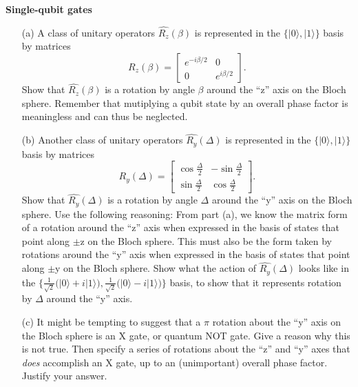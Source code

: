 \documentclass[12pt,letterpaper,boxed,cm]{hmcpset}
\newcommand{\ket}[1]{\big\lvert #1\big\rangle}
\begin{document}
\begin{problem}[2] 
    \textbf{Single-qubit gates} 
    \begin{enumerate}
        \item [(a)] A class of unitary operators $\hat{R_z}(\beta)$ is represented in the $\{\ket{0},\ket{1}\}$ basis by matrices 
        \[
            R_z(\beta) = \begin{bmatrix} e^{-i\beta/2} &  0 \\ 0 & e^{i\beta/2} \end{bmatrix}.
        \]
        Show that $\hat{R_z}(\beta)$ is a rotation by angle $\beta$ around the ``z'' axis on the Bloch sphere.  Remember that mutiplying a qubit state by an overall phase factor is meaningless and can thus be neglected.
        \item [(b)] Another class of unitary operators $\hat{R_y}(\Delta)$ is represented in the $\{\ket{0},\ket{1}\}$ basis by matrices 
        \[
            R_y(\Delta)=\begin{bmatrix} \cos \frac{\Delta}{2} & -\sin \frac{\Delta}{2} \\ \sin \frac{\Delta}{2} & \cos \frac{\Delta}{2} \end{bmatrix}.
        \]
        Show that $\hat{R_y}(\Delta)$ is a rotation by angle $\Delta$ around the ``y'' axis on the Bloch sphere.  Use the following reasoning:  From part (a), we know the matrix form of a rotation around the ``z'' axis when expressed in the basis of states that point along $\pm$z on the Bloch sphere.  This must also be the form taken by rotations around the ``y'' axis when expressed in the basis of states that point along $\pm$y on the Bloch sphere.  Show what the action of $\hat{R_y}(\Delta)$ looks like in the $\{\frac{1}{\sqrt{2}}\bigl(\ket{0}+i\ket{1}\bigr), \frac{1}{\sqrt{2}}\bigl(\ket{0}-i\ket{1}\bigr)\}$ basis, to show that it represents rotation by $\Delta$ around the ``y'' axis.
        \item [(c)] It might be tempting to suggest that a $\pi$ rotation about the ``y'' axis on the Bloch sphere is an X gate, or quantum NOT gate.  Give a reason why this is not true.  Then specify a series of rotations about the ``z'' and ``y'' axes that \textit{does} accomplish an X gate, up to an (unimportant) overall phase factor.  Justify your answer.
    \end{enumerate}  
\end{problem}

\begin{solution}
    \vfill
\end{solution}
\newpage
\end{document}
